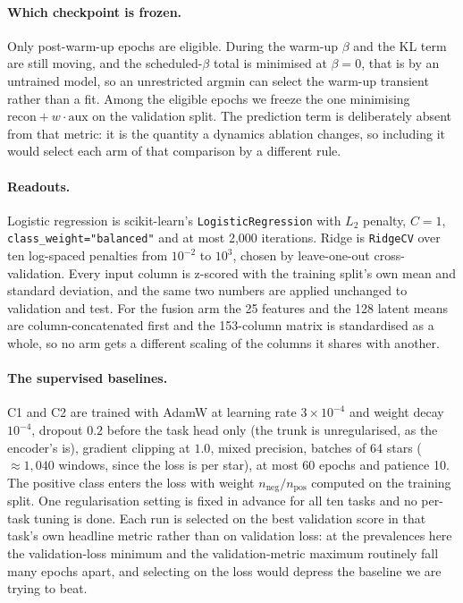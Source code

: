 \documentclass{article}
\begin{document}
\paragraph{Which checkpoint is frozen.} Only post-warm-up epochs are eligible. During the warm-up
$\beta$ and the KL term are still moving, and the scheduled-$\beta$ total is minimised at $\beta=0$,
that is by an untrained model, so an unrestricted argmin can select the warm-up transient rather than
a fit. Among the eligible epochs we freeze the one minimising
$\mathrm{recon} + w\cdot\mathrm{aux}$ on the validation split. The prediction term is deliberately
absent from that metric: it is the quantity a dynamics ablation changes, so including it would select
each arm of that comparison by a different rule.

\paragraph{Readouts.} Logistic regression is scikit-learn's \texttt{LogisticRegression} with $L_{2}$
penalty, $C=1$, \texttt{class\_weight="balanced"} and at most 2{,}000 iterations. Ridge is
\texttt{RidgeCV} over ten log-spaced penalties from $10^{-2}$ to $10^{3}$, chosen by leave-one-out
cross-validation. Every input column is z-scored with the training split's own mean and standard
deviation, and the same two numbers are applied unchanged to validation and test. For the fusion arm
the 25 features and the 128 latent means are column-concatenated first and the 153-column matrix is
standardised as a whole, so no arm gets a different scaling of the columns it shares with another.

\paragraph{The supervised baselines.} C1 and C2 are trained with AdamW at learning rate
$3\times10^{-4}$ and weight decay $10^{-4}$, dropout $0.2$ before the task head only (the trunk is
unregularised, as the encoder's is), gradient clipping at $1.0$, mixed precision, batches of 64
stars ($\approx 1{,}040$ windows, since the loss is per star), at most 60 epochs and patience 10.
The positive class enters the loss with weight $n_{\mathrm{neg}}/n_{\mathrm{pos}}$ computed on the
training split. One regularisation setting is fixed in advance for all ten tasks and no per-task
tuning is done. Each run is selected on the best validation score in that task's own headline metric
rather than on validation loss: at the prevalences here the validation-loss minimum and the
validation-metric maximum routinely fall many epochs apart, and selecting on the loss would depress
the baseline we are trying to beat.
\end{document}
